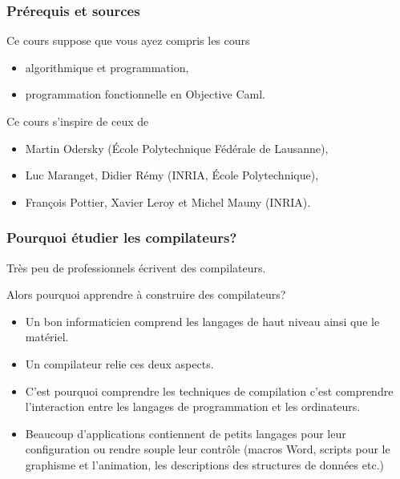 
%
\begin{frame}
\frametitle{Prérequis et sources}

Ce cours suppose que vous ayez compris les cours
\begin{itemize}

  \item algorithmique et programmation,

  \item programmation fonctionnelle en Objective Caml.

\end{itemize}
Ce cours s'inspire de ceux de
\begin{itemize}

  \item Martin Odersky (École Polytechnique Fédérale de
  Lausanne),

  \item Luc Maranget, Didier Rémy (INRIA, École Polytechnique),

  \item François Pottier, Xavier Leroy et Michel Mauny (INRIA).

\end{itemize}

\end{frame}

%
\begin{frame}
\frametitle{Pourquoi étudier les compilateurs?}

Très peu de professionnels écrivent des compilateurs.

\bigskip

Alors pourquoi apprendre à construire des compilateurs?
\begin{itemize}

  \item Un bon informaticien comprend les langages de haut
    niveau ainsi que le matériel.

  \item Un compilateur relie ces deux aspects.

  \item C'est pourquoi comprendre les techniques de
    compilation c'est comprendre l'interaction entre les langages de
    programmation et les ordinateurs.

  \item Beaucoup d'applications contiennent de petits
    langages pour leur configuration ou rendre souple leur contrôle
    (macros Word, scripts pour le graphisme et l'animation, les
    descriptions des structures de données etc.)

\end{itemize}

\end{frame}

